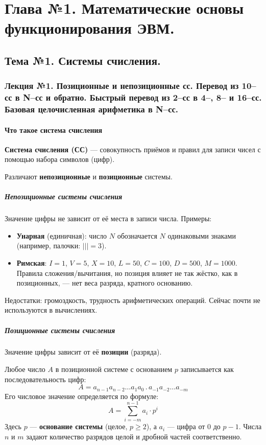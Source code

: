 \part{Глава №1. Математические основы функционирования ЭВМ.}
\chapter{Тема №1. Системы счисления.}
\section{Лекция №1. Позиционные и непозиционные сс. Перевод из 10–сс в N–сс и обратно. Быстрый перевод из 2–сс в 4–, 8– и 16–сс. Базовая целочисленная арифметика в N–сс.}

\subsection{Что такое система счисления}
\textbf{Система счисления (СС)} — совокупность приёмов и правил для записи чисел с помощью набора символов (цифр).

Различают \textbf{непозиционные} и \textbf{позиционные} системы.

\subsubsection*{Непозиционные системы счисления}
Значение цифры не зависит от её места в записи числа.
Примеры:
\begin{itemize}
    \item \textbf{Унарная} (единичная): число $N$ обозначается $N$ одинаковыми знаками (например, палочки: $||| = 3$).
    \item \textbf{Римская}: $I=1$, $V=5$, $X=10$, $L=50$, $C=100$, $D=500$, $M=1000$. Правила сложения/вычитания, но позиция влияет не так жёстко, как в позиционных, — нет веса разряда, кратного основанию.
\end{itemize}
Недостатки: громоздкость, трудность арифметических операций. Сейчас почти не используются в вычислениях.

\subsubsection*{Позиционные системы счисления}
Значение цифры зависит от её \textbf{позиции} (разряда).

Любое число $A$ в позиционной системе с основанием $p$ записывается как последовательность цифр:
\[
A = a_{n-1} a_{n-2} \dots a_1 a_0 \, . \, a_{-1} a_{-2} \dots a_{-m}
\]
Его числовое значение определяется по формуле:
\[
A = \sum_{i=-m}^{n-1} a_i \cdot p^i
\]
Здесь $p$ — \textbf{основание системы} (целое, $p \ge 2$), а $a_i$ — цифра от $0$ до $p-1$. Числа $n$ и $m$ задают количество разрядов целой и дробной частей соответственно.

